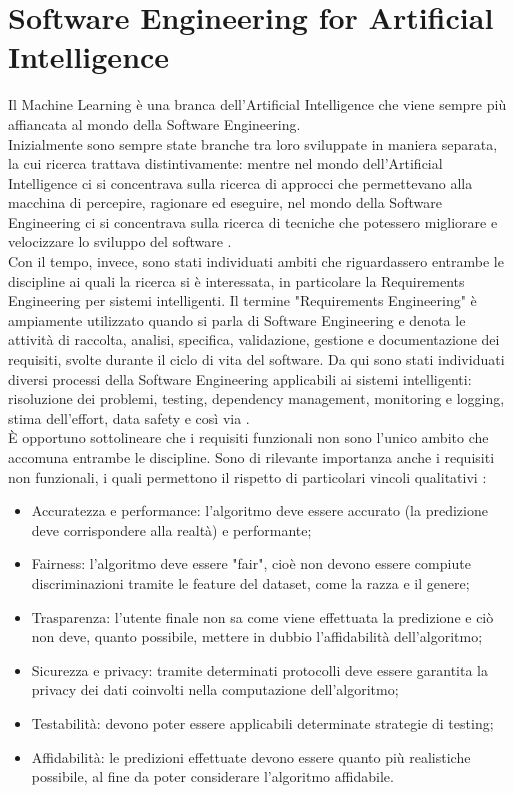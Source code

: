 \section{Software Engineering for Artificial Intelligence}
Il Machine Learning è una branca dell'Artificial Intelligence che viene sempre più affiancata al mondo della Software Engineering.\\
Inizialmente sono sempre state branche tra loro sviluppate in maniera separata, la cui ricerca trattava distintivamente: mentre nel mondo dell'Artificial Intelligence ci si concentrava sulla ricerca di approcci che permettevano alla macchina di percepire, ragionare ed eseguire, nel mondo della Software Engineering ci si concentrava sulla ricerca di tecniche che potessero migliorare e velocizzare lo sviluppo del software \cite{rech2004artificial}.\\
Con il tempo, invece, sono stati individuati ambiti che riguardassero entrambe le discipline ai quali la ricerca si è interessata, in particolare la Requirements Engineering per sistemi intelligenti. Il termine "Requirements Engineering" è ampiamente utilizzato quando si parla di Software Engineering e denota le attività di raccolta, analisi, specifica, validazione, gestione e documentazione dei requisiti, svolte durante il ciclo di vita del software.
Da qui sono stati individuati diversi processi della Software Engineering applicabili ai sistemi intelligenti: risoluzione dei problemi, testing, dependency management, monitoring e logging, stima dell'effort, data safety e così via \cite{belani2019requirements}.\\
È opportuno sottolineare che i requisiti funzionali non sono l'unico ambito che accomuna entrambe le discipline. Sono di rilevante importanza anche i requisiti non funzionali, i quali permettono il rispetto di particolari vincoli qualitativi \cite{horkoff2019non}:
\begin{itemize}
  \item Accuratezza e performance: l'algoritmo deve essere accurato (la predizione deve corrispondere alla realtà) e performante;
  \item Fairness: l'algoritmo deve essere "fair", cioè non devono essere compiute discriminazioni tramite le feature del dataset, come la razza e il genere;
  \item Trasparenza: l'utente finale non sa come viene effettuata la predizione e ciò non deve, quanto possibile, mettere in dubbio l'affidabilità dell'algoritmo;
  \item Sicurezza e privacy: tramite determinati protocolli deve essere garantita la privacy dei dati coinvolti nella computazione dell'algoritmo;
  \item Testabilità: devono poter essere applicabili determinate strategie di testing;
  \item Affidabilità: le predizioni effettuate devono essere quanto più realistiche possibile, al fine da poter considerare l'algoritmo affidabile.
\end{itemize}
